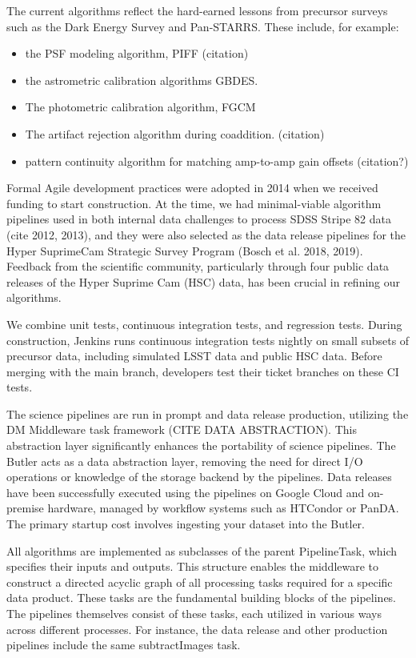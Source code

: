 The current algorithms reflect the hard-earned lessons from precursor surveys such as the Dark Energy Survey and Pan-STARRS.
These include, for example:
\begin{itemize}
\item the PSF modeling algorithm, PIFF (citation)
\item the astrometric calibration algorithms GBDES. \citep{2017PASP..129g4503B}
\item The photometric calibration algorithm, FGCM \citep{2018AJ....155...41B}
\item The artifact rejection algorithm during coaddition. (citation)
\item pattern continuity algorithm for matching amp-to-amp gain offsets (citation?)
\end{itemize}

Formal Agile development practices were adopted in 2014 when we received funding to start construction. At the time, we had minimal-viable algorithm pipelines used in both internal data challenges to process SDSS Stripe 82 data (cite 2012, 2013), and they were also selected as the data release pipelines for the Hyper SuprimeCam Strategic Survey Program  (Bosch et al. 2018, 2019). Feedback from the scientific community, particularly through four public data releases of the Hyper Suprime Cam (HSC) data, has been crucial in refining our algorithms.

We combine unit tests, continuous integration tests, and regression tests. During construction, Jenkins runs continuous integration tests nightly on small subsets of precursor data, including simulated  LSST data and public HSC data. Before merging with the main branch, developers test their ticket branches on these CI tests.

The science pipelines are run in prompt and data release production, utilizing the DM Middleware task framework (CITE DATA ABSTRACTION). This abstraction layer significantly enhances the portability of science pipelines. The Butler acts as a data abstraction layer, removing the need for direct I/O operations or knowledge of the storage backend by the pipelines. Data releases have been successfully executed using the pipelines on Google Cloud and on-premise hardware, managed by workflow systems such as HTCondor or PanDA. The primary startup cost involves ingesting your dataset into the Butler.

All algorithms are implemented as subclasses of the parent PipelineTask, which specifies their inputs and outputs. This structure enables the middleware to construct a directed acyclic graph of all processing tasks required for a specific data product. These tasks are the fundamental building blocks of the pipelines. The pipelines themselves consist of these tasks, each utilized in various ways across different processes. For instance, the data release and other production pipelines include the same subtractImages task.

